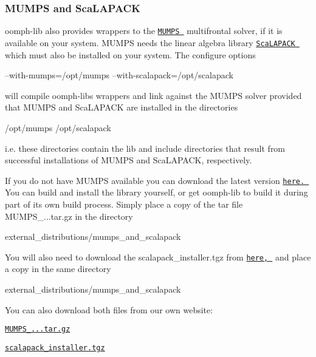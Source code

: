 \hypertarget{index_mumps}{}\subsubsection{M\+U\+M\+P\+S and Sca\+L\+A\+P\+A\+CK}\label{index_mumps}
{\ttfamily oomph-\/lib} also provides wrappers to the \href{http://graal.ens-lyon.fr/MUMPS/}{\tt M\+U\+M\+PS } multifrontal solver, if it is available on your system. {\ttfamily M\+U\+M\+PS} needs the linear algebra library \href{http://www.netlib.org/scalapack/}{\tt Sca\+L\+A\+P\+A\+CK } which must also be installed on your system. The configure options 
\begin{DoxyCode}
--with-mumps=/opt/mumps
--with-scalapack=/opt/scalapack
\end{DoxyCode}
 will compile {\ttfamily oomph-\/lib\textquotesingle{}s} wrappers and link against the {\ttfamily M\+U\+M\+PS} solver provided that {\ttfamily M\+U\+M\+PS} and Sca\+L\+A\+P\+A\+CK  are installed in the directories 
\begin{DoxyCode}
/opt/mumps
/opt/scalapack
\end{DoxyCode}
 i.\+e. these directories contain the {\ttfamily lib} and {\ttfamily include} directories that result from successful installations of {\ttfamily M\+U\+M\+PS} and {\ttfamily Sca\+L\+A\+P\+A\+CK}, respectively.

If you do not have {\ttfamily M\+U\+M\+PS} available you can download the latest version \href{http://graal.ens-lyon.fr/MUMPS/index.php?page=dwnld}{\tt here. } You can build and install the library yourself, or get {\ttfamily oomph-\/lib} to build it during part of its own build process. Simply place a copy of the tar file {\ttfamily M\+U\+M\+P\+S\+\_...\+tar.\+gz} in the directory 
\begin{DoxyCode}
external\_distributions/mumps\_and\_scalapack
\end{DoxyCode}
 You will also need to download the {\ttfamily scalapack\+\_\+installer.\+tgz} from \href{http://www.netlib.org/scalapack/#_scalapack_installer_for_linux}{\tt here, } and place a copy in the same directory 
\begin{DoxyCode}
external\_distributions/mumps\_and\_scalapack
\end{DoxyCode}


You can also download both files from our own website\+: \begin{center} \href{../../../../oomph-lib_external_distfiles/MUMPS_4.10.0.tar.gz}{\tt M\+U\+M\+P\+S\+\_...\+tar.\+gz} \end{center}  \begin{center} \href{../../../../oomph-lib_external_distfiles/scalapack_installer.tgz}{\tt scalapack\+\_\+installer.\+tgz} \end{center} 

